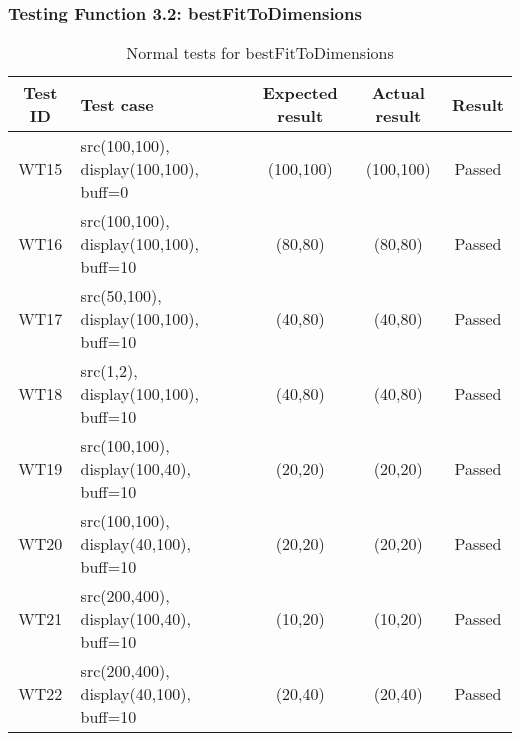 \documentclass{article}
\begin{document}
\subsubsection{Testing Function 3.2: bestFitToDimensions}
\begin{table}[H]
    \caption{Normal tests for bestFitToDimensions}
    \label{tab:wb}
    \centering
    \begin{tabular}{|c|p{}|c|c||c|}
        \hline
        \textbf{Test ID} & \textbf{Test case} & \textbf{Expected result} & \textbf{Actual result} & \textbf{Result}\\
        \hline
        WT15 & src(100,100), display(100,100), buff=0 & (100,100) & (100,100) & Passed \\
        \hline
        WT16 & src(100,100), display(100,100), buff=10 & (80,80) & (80,80) & Passed \\
        \hline
        WT17 & src(50,100), display(100,100), buff=10 & (40,80) & (40,80) & Passed \\
        \hline
        WT18 & src(1,2), display(100,100), buff=10 & (40,80) & (40,80) & Passed \\
        \hline
        WT19 & src(100,100), display(100,40), buff=10 & (20,20) & (20,20) & Passed \\
        \hline
        WT20 & src(100,100), display(40,100), buff=10 & (20,20) & (20,20) & Passed \\
        \hline
        WT21 & src(200,400), display(100,40), buff=10 & (10,20) & (10,20) & Passed \\
        \hline
        WT22 & src(200,400), display(40,100), buff=10 & (20,40) & (20,40) & Passed \\
        \hline
    \end{tabular}
\end{table}
\end{document}
